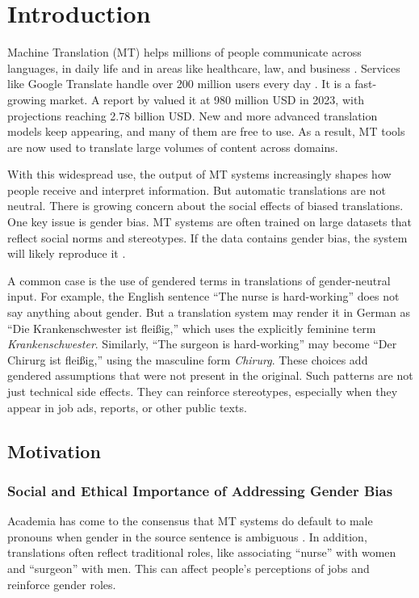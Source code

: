 \chapter{Introduction}
Machine Translation (MT) helps millions of people communicate across languages, in daily life and in areas like healthcare, law, and business \parencite{kapplAreAllSpanish2025}. Services like Google Translate handle over 200 million users every day \parencite{pratesAssessingGenderBias2019,shresthaExploringGenderBiases2022}. It is a fast-growing market. A report by \textcite{skyquestMachineTranslationMT2025} valued it at 980 million USD in 2023, with projections reaching 2.78 billion USD. New and more advanced translation models keep appearing, and many of them are free to use. As a result, MT tools are now used to translate large volumes of content across domains.

With this widespread use, the output of MT systems increasingly shapes how people receive and interpret information. But automatic translations are not neutral. There is growing concern about the social effects of biased translations. One key issue is gender bias. MT systems are often trained on large datasets that reflect social norms and stereotypes. If the data contains gender bias, the system will likely reproduce it \parencite{choMeasuringGenderBias2019,soundararajanInvestigatingGenderBias2024,smacchiaDoesAIReflect2024}.

A common case is the use of gendered terms in translations of gender-neutral input. For example, the English sentence “The nurse is hard-working” does not say anything about gender. But a translation system may render it in German as “Die Krankenschwester ist fleißig,” which uses the explicitly feminine term \textit{Krankenschwester}. Similarly, “The surgeon is hard-working” may become “Der Chirurg ist fleißig,” using the masculine form \textit{Chirurg}. These choices add gendered assumptions that were not present in the original. Such patterns are not just technical side effects. They can reinforce stereotypes, especially when they appear in job ads, reports, or other public texts.


\section{Motivation}

\subsection{Social and Ethical Importance of Addressing Gender Bias}\label{section:social_and_ethical_importance_of_addressing}
Academia has come to the consensus that MT systems do default to male pronouns when gender in the source sentence is ambiguous \parencite{pratesAssessingGenderBias2019,choMeasuringGenderBias2019,rescignoGenderBiasMachine2023}.  In addition, translations often reflect traditional roles, like associating “nurse” with women and “surgeon” with men. This can affect people’s perceptions of jobs and reinforce gender roles.

